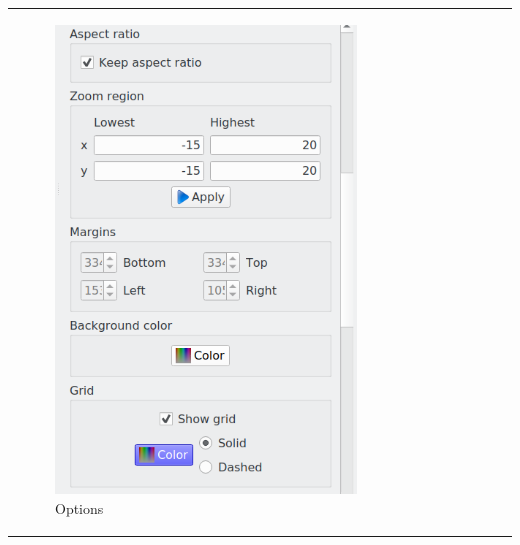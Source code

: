 \documentclass[10pt]{article}
\begin{document}
\begin{tabular}{lcr}
\begin{minipage}{.3\linewidth}
\begin{figure}[H]
\begin{center}
\includegraphics[width=.73\linewidth]{damqt320_2D_options_2.png}
\end{center}
\vspace*{8mm}
\caption{Options \label{fig:3_9}}
\end{figure}
\end{minipage}
&
\begin{minipage}{.3\linewidth}
\hspace*{-3mm}
\begin{figure}[H]
\begin{center}
\vspace*{-8mm}

\end{center}
\end{figure}
\end{minipage}
\end{tabular}
\end{document}
